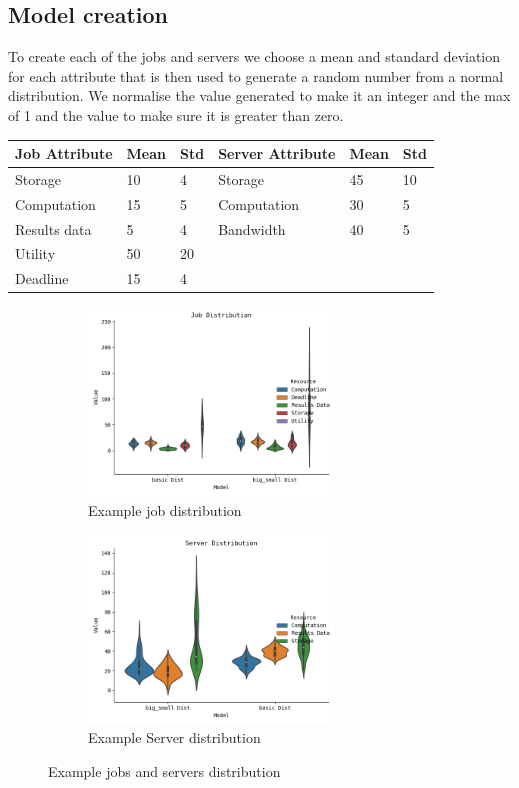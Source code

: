 \documentclass[fleqn]{article}
\begin{document}
\subsection{Model creation}\label{subsec:model-creation}
To create each of the jobs and servers we choose a mean and standard deviation for each attribute that is then used to generate a random number from a normal distribution.
We normalise the value generated to make it an integer and the max of 1 and the value to make sure it is greater than zero.

\begin{tabu} to 1\textwidth { | X[l] | X[l] | X[l] | X[l] | X[l] | X[l] | }
\hline
Job Attribute & Mean & Std & Server Attribute & Mean & Std \\
\hline
Storage & 10 & 4 & Storage & 45 & 10 \\
\hline
Computation & 15 & 5 & Computation & 30 & 5 \\
\hline
Results data & 5 & 4 & Bandwidth & 40 & 5 \\
\hline
Utility & 50 & 20 & & & \\
\hline
Deadline & 15 & 4 & & & \\
\hline
\end{tabu}

\begin{figure}[H]
    \begin{subfigure}{0.5\textwidth}
        \includegraphics[width=1\linewidth, height=5cm]{../results/job_distribution.png}
        \caption{Example job distribution}
    \end{subfigure}
    \begin{subfigure}{0.5\textwidth}
        \includegraphics[width=1\linewidth, height=5cm]{../results/server_distribution.png}
        \caption{Example Server distribution}
    \end{subfigure}

    \caption{Example jobs and servers distribution}
\end{figure}
\end{document}
